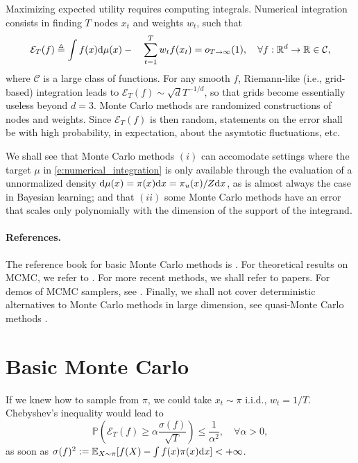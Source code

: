 
Maximizing expected utility requires computing integrals. 
Numerical integration consists in finding $T$ nodes $x_t$ and weights $w_t$, such
that
$$
{\mathcal{E}_T(f)} \triangleq  \int f(x)\mathrm{d}\mu(x)  - \quad \sum_{t=1}^T w_t f(x_t) = o_{T\rightarrow \infty}(1), \quad \forall
f:\mathbb{R}^d\rightarrow\mathbb{R}\in\mathcal C,
$$
where $\mathcal C$ is a large class of functions.
For any smooth $f$, Riemann-like (i.e., grid-based) integration leads to $\mathcal{E}_T(f) \sim \sqrt{d} T^{-1/d}$, so that grids become essentially useless beyond $d=3$.
Monte Carlo methods are randomized constructions of nodes and weights. 
Since $\mathcal{E}_T(f)$ is then random, statements on the error shall be with high probability, in expectation, about the asymtotic fluctuations, etc.

We shall see that Monte Carlo methods $(i)$ can accomodate settings where the target $\mu$ in \eqref{e:numerical_integration} is only available through the evaluation of a unnormalized density $\mathrm{d}\mu(x) = \pi(x)\mathrm{d} x = \pi_u(x)/Z\mathrm{d} x$, as is almost always the case in Bayesian learning; and that $(ii)$ some Monte Carlo methods have an error that scales only polynomially with the dimension of the support of the integrand.

\paragraph{References.} 
The reference book for basic Monte Carlo methods is \citep{RoCa04}. 
For theoretical results on MCMC, we refer to \citep[Chapters 5 to 7]{DoMoSt14}. 
For more recent methods, we shall refer to papers.
For demos of MCMC samplers, see \cfdemo.
Finally, we shall not cover deterministic alternatives to Monte Carlo methods in large dimension, see quasi-Monte Carlo methods \citep{DiPi10}.

\section{Basic Monte Carlo}

If we knew how to sample from $\pi$, we could take $x_t\sim\pi$ i.i.d., $w_t=1/T$.
Chebyshev's inequality would lead to
  $$ \mathbb{P}\left({\mathcal{E}_T(f)} \geq \alpha\frac{\sigma(f)}{\sqrt{T}} \right) \leq \frac{1}{\alpha^2}, \quad \forall \alpha>0,$$
  as soon as $\sigma(f)^2 := \mathbb{E}_{X\sim\pi} [f(X) - \int f(x)\pi(x)\mathrm{d} x]<+\infty$.

